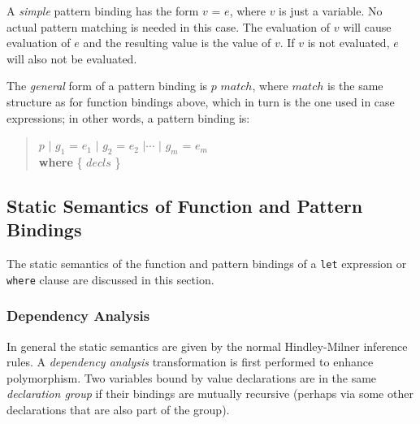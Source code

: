 A \emph{simple} pattern binding has the form $v$ = $e$, where $v$ is just a variable. No actual pattern matching is needed in this case. The evaluation of $v$ will cause evaluation of $e$ and the resulting value is the value of $v$. If $v$ is not evaluated, $e$ will also not be evaluated.

The \emph{general} form of a pattern binding is $p$ $match$, where $match$ is the same structure as for function bindings above, which in turn is the one used in case expressions; in other words, a pattern binding is:
\begin{quote}
\begin{flushleft}
$p$ $|$ $g_1$ = $e_1$ $|$ $g_2$ = $e_2$ $|\cdots$ $|$ $g_m$ = $e_m$\\
\hspace{0.3cm}\textbf{where} \{ $decls$ \}
\end{flushleft}
\end{quote}

\subsection{Static Semantics of Function and Pattern Bindings} \label{letsemantics}

The static semantics of the function and pattern bindings of a \texttt{let} expression or \texttt{where} clause are discussed in this section.

\subsubsection{Dependency Analysis} \label{declgroup}

In general the static semantics are given by the normal Hindley-Milner inference rules.
A \emph{dependency analysis} transformation is first performed to enhance polymorphism.
Two variables bound by value declarations are in the same \emph{declaration group} if their bindings are mutually recursive (perhaps via some other declarations that are also part of the group).

